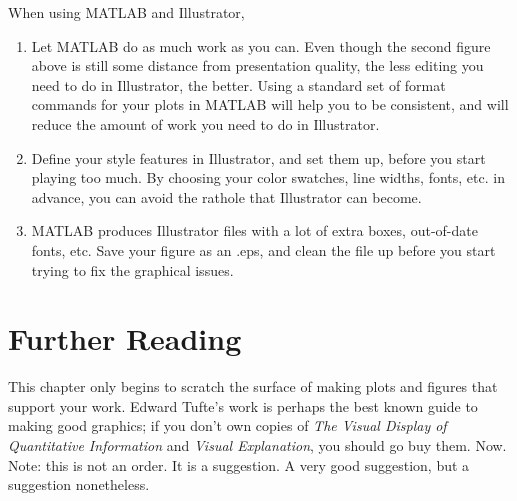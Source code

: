 When using MATLAB and Illustrator, 
\begin{enumerate}
\item Let MATLAB do as much work as you can.  Even though the second figure above is still some distance from presentation quality, the less editing you need to do in Illustrator, the better.  Using a standard set of format commands for your plots in MATLAB will help you to be consistent, and will reduce the amount of work you need to do in Illustrator.
\item Define your style features in Illustrator, and set them up, before you start playing too much.  By choosing your color swatches, line widths, fonts, etc. in advance, you can avoid the rathole that Illustrator can become.
\item MATLAB produces Illustrator files with a lot of extra boxes, out-of-date fonts, etc.  Save your figure as an .eps, and clean the file up before you start trying to fix the graphical issues. 
\end{enumerate}

\section{Further Reading}

This chapter only begins to scratch the surface of making plots and figures that support your work.  Edward Tufte's work is perhaps the best known guide to making good graphics; if you don't own copies of {\it The Visual Display of Quantitative Information} and {\it Visual Explanation}, you should go buy them.  Now.  Note: this is not an order.  It is a suggestion.  A very good suggestion, but a suggestion nonetheless.
